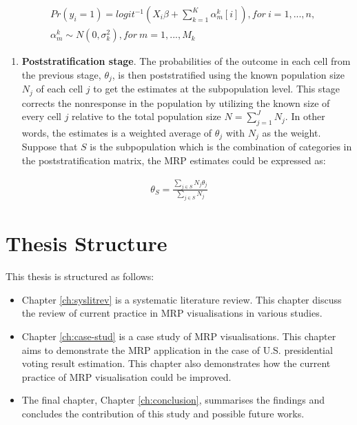 \documentclass{monashthesis}
\begin{document}
\begin{equation} 
\begin{split}
& Pr(y_i = 1) = logit^{-1}\left(X_i\beta + \sum^K_{k=1}\alpha^k_m[i]\right), for\ i=1, ..., n,\\
& \alpha^k_m \sim N(0, \sigma^2_k), for\ m = 1, ..., M_k
\end{split}
\label{eq:mrp-stage1}
\end{equation}

\begin{enumerate}
\def\labelenumi{\arabic{enumi}.}
\setcounter{enumi}{1}
\tightlist
\item
  \textbf{Poststratification stage}. The probabilities of the outcome in each cell from the previous stage, \(\theta_j\), is then poststratified using the known population size \(N_j\) of each cell \(j\) to get the estimates at the subpopulation level. This stage corrects the nonresponse in the population by utilizing the known size of every cell \(j\) relative to the total population size \(N = \sum_{j=1}^J N_j\). In other words, the estimates is a weighted average of \(\theta_j\) with \(N_j\) as the weight. Suppose that \(S\) is the subpopulation which is the combination of categories in the poststratification matrix, the MRP estimates could be expressed as:
\end{enumerate}

\begin{equation} 
\begin{split}
\theta_S = \frac{\sum_{j \in S}N_j\theta_j}{\sum_{j\in S}N_j}
\end{split}
\label{eq:mrp-stage2}
\end{equation}

\hypertarget{thesis-structure}{%
\section{Thesis Structure}\label{thesis-structure}}

This thesis is structured as follows:

\begin{itemize}
\item
  Chapter \ref{ch:syslitrev} is a systematic literature review. This chapter discuss the review of current practice in MRP visualisations in various studies.
\item
  Chapter \ref{ch:case-stud} is a case study of MRP visualisations. This chapter aims to demonstrate the MRP application in the case of U.S. presidential voting result estimation. This chapter also demonstrates how the current practice of MRP visualisation could be improved.
\item
  The final chapter, Chapter \ref{ch:conclusion}, summarises the findings and concludes the contribution of this study and possible future works.
\end{itemize}
\end{document}
